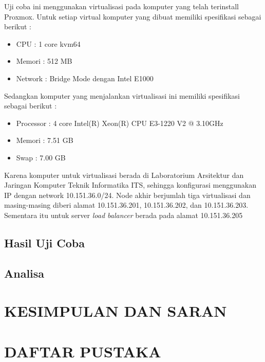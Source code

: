 \documentclass[oneside]{book}
\begin{document}
	Uji coba ini menggunakan virtualisasi pada komputer yang telah terinstall Proxmox. Untuk setiap virtual komputer yang dibuat memiliki spesifikasi sebagai berikut :

	
	\begin{itemize}
		\item CPU \tabto{2cm} : 1 core kvm64
		\item Memori \tabto{2cm} : 512 MB
		\item Network \tabto{2cm} : Bridge Mode dengan Intel E1000
	\end{itemize}
	
	Sedangkan komputer yang menjalankan virtualisasi ini memiliki spesifikasi sebagai berikut :
	
	\begin{itemize}
		\item Processor \tabto{2cm} : 4 core Intel(R) Xeon(R) CPU E3-1220 V2 @ 3.10GHz
		\item Memori \tabto{2cm} : 7.51 GB
		\item Swap \tabto{2cm} : 7.00 GB
	\end{itemize}
	
	Karena komputer untuk virtualisasi berada di Laboratorium Arsitektur dan Jaringan Komputer Teknik Informatika ITS, sehingga konfigurasi menggunakan IP dengan network 10.151.36.0/24. Node akhir berjumlah tiga virtualisasi dan masing-masing diberi alamat 10.151.36.201, 10.151.36.202, dan 10.151.36.203. Sementara itu untuk server \textit{load balancer} berada pada alamat 10.151.36.205
	
	\section{Hasil Uji Coba}
	
	\section{Analisa}
	
	

	\chapter{KESIMPULAN DAN SARAN}
	
	\backmatter

	\chapter{DAFTAR PUSTAKA}
	
	
\end{document}
